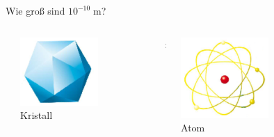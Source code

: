 \documentclass{beamer}
\newcommand{\m}{\ensuremath{\;\text{m}}\xspace}
\begin{document}
\begin{frame}
\begin{columns}[T]
\begin{column}{0.25\textwidth}
    \end{column}
    \begin{column}{0.75\textwidth}
      \centering
      \alert{Wie gro\ss{} sind $10^{-10}\m$?}
      \begin{columns}
        \begin{column}{0.1\textwidth}
        \end{column}
        \begin{column}{0.35\textwidth}
          \centering
          \includegraphics[width=0.6\textwidth]{matter/Kristall.png}\\
          Kristall
        \end{column}
        \begin{column}{0.1\textwidth}
          \centering
          {\Huge :}
        \end{column}
        \begin{column}{0.35\textwidth}
          \centering
          \includegraphics[width=0.6\textwidth]{matter/Atom.png}\\
          Atom
        \end{column}
        \begin{column}{0.1\textwidth}

\end{column}
\end{columns}
\end{column}
\end{columns}
\end{frame}
\end{document}

